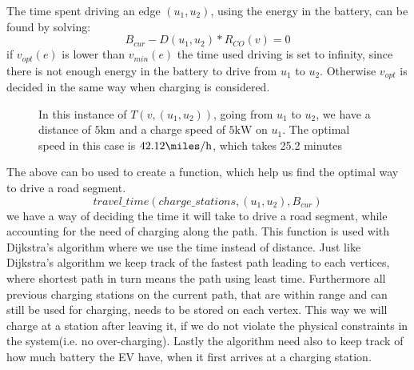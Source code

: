 The time spent driving an edge $(u_1, u_2)$, using the energy in the battery, can be found by solving:
\[B_{cur} - D(u_1, u_2) * R_{CO}(v) = 0\] 
if $v_{opt}(e)$ is lower than $v_{min}(e)$ the time used driving is set to infinity, since there is not enough energy in the battery to drive from $u_1$ to $u_2$. Otherwise $v_{opt}$ is decided in the same way when charging is considered.\\

\begin{figure}[!htb]
\label{fig:graph}
% 
\caption{In this instance of $T(v,(u_1, u_2))$, going from $u_1$ to $u_2$, we have a distance of $5 \si{\km}$ and a charge speed of $5 \si{\kW}$ on $u_1$. The optimal speed in this case is $42.12\si{\miles\per\hour}$, which takes 25.2 minutes}
\end{figure}


The above can bo used to create a function, which help us find the optimal way to drive a road segment. 
\[travel\_time(charge\_stations, (u_1, u_2), B_{cur}) \]
we have a way of deciding the time it will take to drive a road segment, while accounting for the need of charging along the path. This function is used with Dijkstra's algorithm where we use the time instead of distance. Just like Dijkstra's algorithm we keep track of the fastest path leading to each vertices, where shortest path in turn means the path using least time. Furthermore all previous charging stations on the current path, that are within range and can still be used for charging, needs to be stored on each vertex. This way we will charge at a station after leaving it, if we do not violate the physical constraints in the system(i.e. no over-charging). Lastly the algorithm need also to keep track of how much battery the EV have, when it first arrives at a charging station.\\


